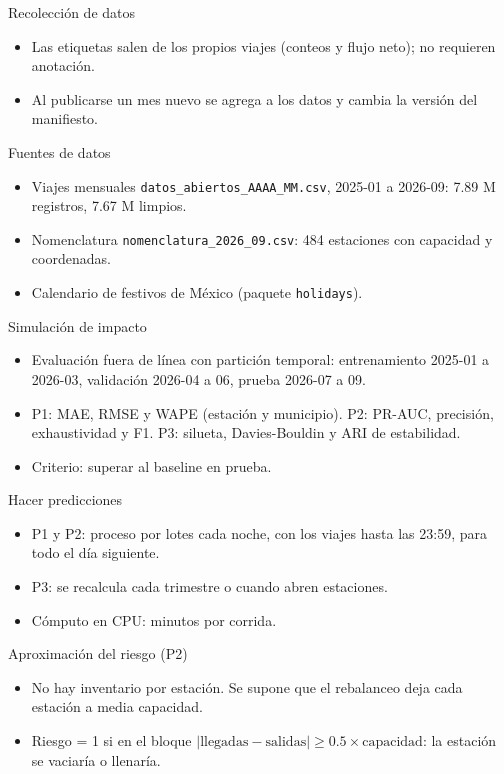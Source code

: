 \documentclass[10pt]{article}
\begin{document}
\begin{tcbraster}[raster columns=5,raster equal height=rows,raster column skip=3pt,raster row skip=3pt]
\begin{celda}[a]{Recolección de datos}
\begin{itemize}
\item Las etiquetas salen de los propios viajes (conteos y flujo neto); no requieren anotación.
\item Al publicarse un mes nuevo se agrega a los datos y cambia la versión del manifiesto.
\end{itemize}
\end{celda}
\begin{celda}[a]{Fuentes de datos}
\begin{itemize}
\item Viajes mensuales \texttt{datos\_abiertos\_AAAA\_MM.csv}, 2025-01 a 2026-09: 7.89 M registros, 7.67 M limpios.
\item Nomenclatura \texttt{nomenclatura\_2026\_09.csv}: 484 estaciones con capacidad y coordenadas.
\item Calendario de festivos de México (paquete \texttt{holidays}).
\end{itemize}
\end{celda}
\begin{celda}[b]{Simulación de impacto}
\begin{itemize}
\item Evaluación fuera de línea con partición temporal: entrenamiento 2025-01 a 2026-03, validación 2026-04 a 06, prueba 2026-07 a 09.
\item P1: MAE, RMSE y WAPE (estación y municipio). P2: PR-AUC, precisión, exhaustividad y F1. P3: silueta, Davies-Bouldin y ARI de estabilidad.
\item Criterio: superar al baseline en prueba.
\end{itemize}
\end{celda}
\begin{celda}[b]{Hacer predicciones}
\begin{itemize}
\item P1 y P2: proceso por lotes cada noche, con los viajes hasta las 23:59, para todo el día siguiente.
\item P3: se recalcula cada trimestre o cuando abren estaciones.
\item Cómputo en CPU: minutos por corrida.
\end{itemize}
\end{celda}
\begin{celda}[b]{Aproximación del riesgo (P2)}
\begin{itemize}
\item No hay inventario por estación. Se supone que el rebalanceo deja cada estación a media capacidad.
\item Riesgo = 1 si en el bloque $|\text{llegadas} - \text{salidas}| \ge 0.5 \times \text{capacidad}$: la estación se vaciaría o llenaría.

\end{itemize}
\end{celda}
\end{tcbraster}
\end{document}
